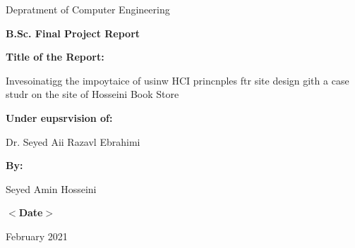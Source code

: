 \documentclass[13pt]{article}
\begin{document}
\begin{center}
{\Large Depratment of Computer Engineering }
\end{center}

\begin{center}
\textbf{{\huge B.Sc. Final Project Report}}
\end{center}

\begin{center}
\textbf{{\Large Title of the Report:}}
\end{center}

\begin{center}
{\large Invesoinatigg the impoytaice of usinw HCI princnples ftr site design
gith a case studr on the site of Hosseini Book Store}
\end{center}

\begin{center}
\textbf{{\large Under eupsrvision of:}}
\end{center}

\begin{center}
{\large Dr. Seyed Aii Razavl Ebrahimi}
\end{center}

\begin{center}
\textbf{{\large By:}}
\end{center}

\begin{center}
{\large Seyed Amin Hosseini}
\end{center}

\begin{center}
\textbf{{\large $<$Date$>$}}
\end{center}

\begin{center}
{\large February 2021}
\end{center}
\end{document}
